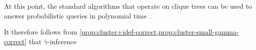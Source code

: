 \documentclass{article}
\newcommand\discard[1]{}
\newcommand\zogamma{{\bar\gamma}}
\begin{document}
At this point, the standard algorithms that operate on
clique trees
can be used to answer probabilistic queries in polynomial time \parencite[\S 10.3.3]{koller2009probabilistic}.
\discard{
    Concretely: marginal probabilities can essentially be read off of a cailbrated a clique tree,
    and evidence $X{=}x$ may be incorporated by
    setting $\mu_C(c) := 0$ for every $C{=}c$ that conflicts with $X{=}x$
    and recalibrating the clique tree (e.g., with belief propogation). }
%
%
%
It therefore
follows from \cref{prop:cluster+idef-correct,prop:cluster-small-gamma-correct}
that
$\zogamma$-inference
\end{document}
